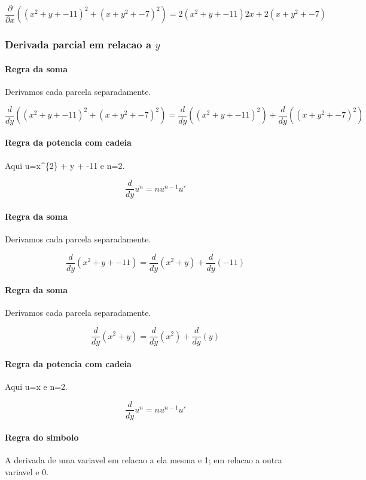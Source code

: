 \documentclass[11pt,a4paper]{article}
\begin{document}
\[
\frac{\partial}{\partial x}\left(\left(x^{2} + y + -11\right)^{2} + \left(x + y^{2} + -7\right)^{2}\right)=2\left(x^{2} + y + -11\right)2x + 2\left(x + y^{2} + -7\right)
\]

\subsubsection{Derivada parcial em relacao a $y$}

\paragraph{Regra da soma} Derivamos cada parcela separadamente.

\[
\frac{d}{dy}\left(\left(x^{2} + y + -11\right)^{2} + \left(x + y^{2} + -7\right)^{2}\right)=\frac{d}{dy}\left(\left(x^{2} + y + -11\right)^{2}\right)+\frac{d}{dy}\left(\left(x + y^{2} + -7\right)^{2}\right)
\]

\paragraph{Regra da potencia com cadeia} Aqui u=x\textasciicircum{}\{2\} + y + -11 e n=2.

\[
\frac{d}{dy}u^n=n u^{n-1}u'
\]

\paragraph{Regra da soma} Derivamos cada parcela separadamente.

\[
\frac{d}{dy}\left(x^{2} + y + -11\right)=\frac{d}{dy}\left(x^{2} + y\right)+\frac{d}{dy}\left(-11\right)
\]

\paragraph{Regra da soma} Derivamos cada parcela separadamente.

\[
\frac{d}{dy}\left(x^{2} + y\right)=\frac{d}{dy}\left(x^{2}\right)+\frac{d}{dy}\left(y\right)
\]

\paragraph{Regra da potencia com cadeia} Aqui u=x e n=2.

\[
\frac{d}{dy}u^n=n u^{n-1}u'
\]

\paragraph{Regra do simbolo} A derivada de uma variavel em relacao a ela mesma e 1; em relacao a outra variavel e 0.
\end{document}
